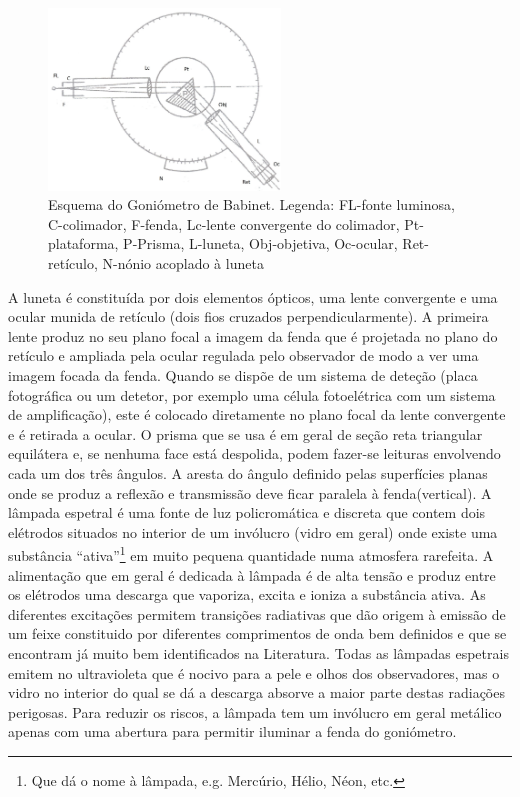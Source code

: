 \documentclass[a4paper,12pt]{article}  %
\begin{document}
\begin{figure}[!htb]  
	\centering 
	\includegraphics[width=0.55\textwidth]{babinet}
	\caption{Esquema do Goniómetro de Babinet. Legenda: FL-fonte luminosa, C-colimador, F-fenda, Lc-lente convergente do colimador, Pt-plataforma, P-Prisma, L-luneta, Obj-objetiva, Oc-ocular, Ret-retículo, N-nónio acoplado à luneta\label{fig:babinet}} 
\end{figure}

A luneta é constituída por dois elementos ópticos, uma lente convergente e uma ocular munida de retículo (dois fios cruzados perpendicularmente). A primeira lente produz no seu plano focal a imagem da fenda que é projetada no plano do retículo e ampliada pela ocular regulada pelo observador de modo a ver uma imagem focada da fenda. Quando se dispõe de um sistema de deteção (placa fotográfica ou um detetor, por exemplo uma célula fotoelétrica com um sistema de amplificação), este é colocado diretamente no plano focal da lente convergente e é retirada a ocular.
O prisma que se usa é em geral de seção reta triangular equilátera e, se nenhuma face está despolida, podem fazer-se leituras envolvendo cada um dos três ângulos. A aresta do ângulo definido pelas superfícies planas onde se produz a reflexão e transmissão deve ficar paralela à fenda(vertical).
A lâmpada espetral é uma fonte de luz policromática e discreta que contem dois elétrodos situados no interior de um invólucro (vidro em geral) onde existe uma substância “ativa”\footnote{Que dá o nome à lâmpada, e.g. Mercúrio, Hélio, Néon, etc.} em muito pequena quantidade numa atmosfera rarefeita. A alimentação que em geral é dedicada à lâmpada é de alta tensão e produz entre os elétrodos uma descarga que vaporiza, excita e ioniza a substância ativa. As diferentes excitações permitem transições radiativas que dão origem à emissão de um feixe constituido por diferentes comprimentos de onda bem definidos e que se encontram já muito bem identificados na Literatura. 
Todas as lâmpadas espetrais emitem no ultravioleta que é nocivo para a pele e olhos dos observadores, mas o vidro no interior do qual se dá a descarga absorve a maior parte destas radiações perigosas. Para reduzir os riscos, a lâmpada tem um invólucro em geral metálico apenas com uma abertura para permitir iluminar a fenda do goniómetro.
\end{document}
